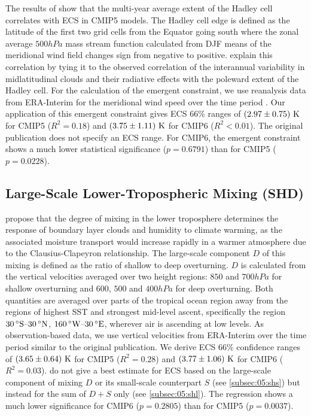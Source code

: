 The results of \textcite{Lipat2017} show that the multi-year average extent of
the Hadley cell correlates with \acs{ECS} in \acs{CMIP}5 models. The Hadley
cell edge is defined as the latitude of the first two grid cells from the
Equator going south where the zonal average $500 \unit{hPa}$ mass stream
function calculated from \ac{DJF} means of the meridional wind field changes
sign from negative to positive. \textcite{Lipat2017} explain this correlation
by tying it to the observed correlation of the interannual variability in
midlatitudinal clouds and their radiative effects with the poleward extent of
the Hadley cell. For the calculation of the emergent constraint, we use
reanalysis data from ERA-Interim \autocite{Dee2011} for the meridional wind
speed over the time period . Our application of this emergent
constraint gives \ac{ECS} $66 \unit{\%}$ ranges of
$\pmrangeunit{2.97}{0.75}{K}$ for \acs{CMIP}5 ($R^2 = 0.18$) and
$\pmrangeunit{3.75}{1.11}{K}$ for \acs{CMIP}6 ($R^2 < 0.01$). The original
publication does not specify an \ac{ECS} range. For \acs{CMIP}6, the emergent
constraint shows a much lower statistical significance ($p = 0.6791$) than for
\acs{CMIP}5 ($p = 0.0228$).


\subsection{Large-Scale Lower-Tropospheric Mixing (SHD)}
\label{subsec:05:shd}

\textcite{Sherwood2014} propose that the degree of mixing in the lower
troposphere determines the response of boundary layer clouds and humidity to
climate warming, as the associated moisture transport would increase rapidly in
a warmer atmosphere due to the Clausius-Clapeyron relationship. The large-scale
component $D$ of this mixing is defined as the ratio of shallow to deep
overturning. $D$ is calculated from the vertical velocities averaged over two
height regions: $850$ and $700 \unit{hPa}$ for shallow overturning and $600$,
$500$ and $400 \unit{hPa}$ for deep overturning. Both quantities are averaged
over parts of the tropical ocean region away from the regions of highest
\ac{SST} and strongest mid-level ascent, specifically the region $\range{30
  \unit{\degree S}}{30 \unit{\degree N}}$, $\range{160 \unit{\degree W}}{30
  \unit{\degree E}}$, wherever air is ascending at low levels. As
observation-based data, we use vertical velocities from ERA-Interim
\autocite{Dee2011} over the time period  similar to the
original publication. We derive \ac{ECS} $66 \unit{\%}$ confidence ranges of
$\pmrangeunit{3.65}{0.64}{K}$ for \acs{CMIP}5 ($R^2 = 0.28$) and
$\pmrangeunit{3.77}{1.06}{K}$ for \acs{CMIP}6 ($R^2 = 0.03$).
\textcite{Sherwood2014} do not give a best estimate for \ac{ECS} based on the
large-scale component of mixing $D$ or its small-scale counterpart $S$ (see
\cref{subsec:05:shs}) but instead for the sum of $D + S$ only (see
\cref{subsec:05:shl}). The regression shows a much lower significance for
\acs{CMIP}6 ($p = 0.2805$) than for \acs{CMIP}5 ($p = 0.0037$).

